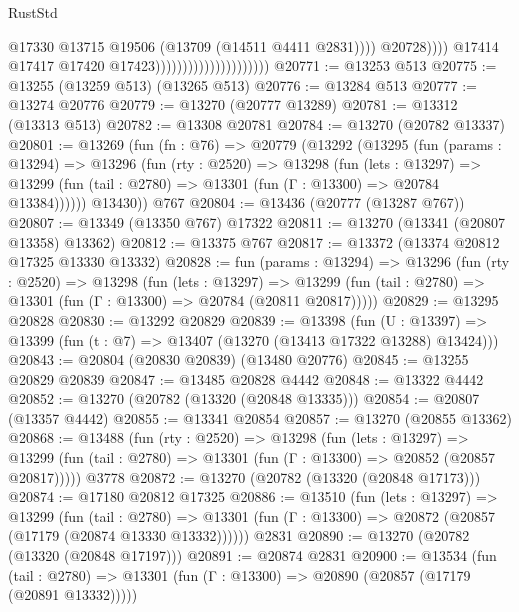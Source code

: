 \begin{lexlean}{RustStd}
\begin{coremodule}
                                                          @17330
                                                          @13715
                                                          @19506
                                                          (@13709 (@14511 @4411 @2831))))
                                                      @20728))))
                                              @17414
                                              @17417
                                              @17420
                                              @17423)))))))))))))))))))))
@20771 := @13253 @513
@20775 := @13255 (@13259 @513) (@13265 @513)
@20776 := @13284 @513
@20777 := @13274 @20776
@20779 := @13270 (@20777 @13289)
@20781 := @13312 (@13313 @513)
@20782 := @13308 @20781
@20784 := @13270 (@20782 @13337)
@20801 := @13269
    (fun (fn : @76) =>
    @20779
      (@13292
        (@13295
          (fun (params : @13294) =>
          @13296
            (fun (rty : @2520) =>
            @13298
              (fun (lets : @13297) =>
              @13299 (fun (tail : @2780) => @13301 (fun (Γ : @13300) => @20784 @13384))))))
        @13430))
    @767
@20804 := @13436 (@20777 (@13287 @767))
@20807 := @13349 (@13350 @767) @17322
@20811 := @13270 (@13341 (@20807 @13358) @13362)
@20812 := @13375 @767
@20817 := @13372 (@13374 @20812 @17325 @13330 @13332)
@20828 := fun (params : @13294) =>
  @13296
    (fun (rty : @2520) =>
    @13298
      (fun (lets : @13297) =>
      @13299 (fun (tail : @2780) => @13301 (fun (Γ : @13300) => @20784 (@20811 @20817)))))
@20829 := @13295 @20828
@20830 := @13292 @20829
@20839 := @13398
    (fun (U : @13397) => @13399 (fun (t : @7) => @13407 (@13270 (@13413 @17322 @13288) @13424)))
@20843 := @20804 (@20830 @20839) (@13480 @20776)
@20845 := @13255 @20829 @20839
@20847 := @13485 @20828 @4442
@20848 := @13322 @4442
@20852 := @13270 (@20782 (@13320 (@20848 @13335)))
@20854 := @20807 (@13357 @4442)
@20855 := @13341 @20854
@20857 := @13270 (@20855 @13362)
@20868 := @13488
    (fun (rty : @2520) =>
    @13298
      (fun (lets : @13297) =>
      @13299 (fun (tail : @2780) => @13301 (fun (Γ : @13300) => @20852 (@20857 @20817)))))
    @3778
@20872 := @13270 (@20782 (@13320 (@20848 @17173)))
@20874 := @17180 @20812 @17325
@20886 := @13510
    (fun (lets : @13297) =>
    @13299
      (fun (tail : @2780) =>
      @13301 (fun (Γ : @13300) => @20872 (@20857 (@17179 (@20874 @13330 @13332))))))
    @2831
@20890 := @13270 (@20782 (@13320 (@20848 @17197)))
@20891 := @20874 @2831
@20900 := @13534
    (fun (tail : @2780) => @13301 (fun (Γ : @13300) => @20890 (@20857 (@17179 (@20891 @13332)))))

\end{coremodule}
\end{lexlean}
